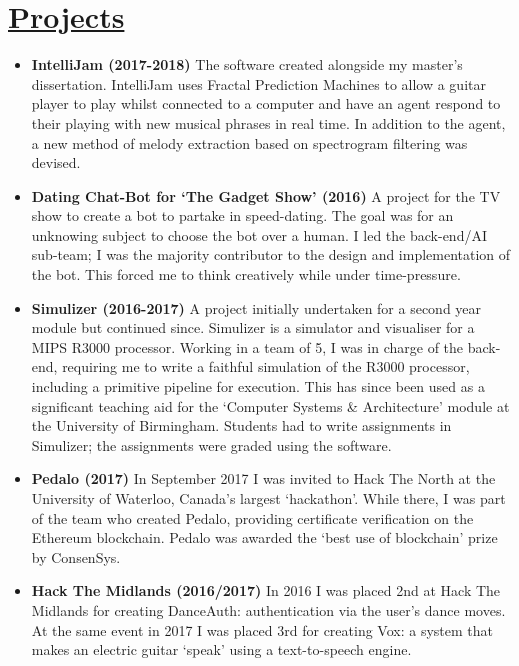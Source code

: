 \documentclass[11pt]{article}
\begin{document}
	\vspace{-20pt}
	\hspace{-100pt}\section*{\underline{Projects}} %
			\begin{itemize}
				\item \textbf{IntelliJam (2017-2018)} The software created alongside my master's dissertation. IntelliJam uses Fractal Prediction Machines to allow a guitar player to play whilst connected to a computer and have an agent respond to their playing with new musical phrases in real time. In addition to the agent, a new method of melody extraction based on spectrogram filtering was devised.
				\item \textbf{Dating Chat-Bot for `The Gadget Show' (2016)} A project for the TV show to create a bot to partake in speed-dating. The goal was for an unknowing subject to choose the bot over a human. I led the back-end/AI sub-team; I was the majority contributor to the design and implementation of the bot. This forced me to think creatively while under time-pressure.
				\item \textbf{Simulizer (2016-2017)} A project initially undertaken for a second year module but continued since. Simulizer is a simulator and visualiser for a MIPS R3000 processor. Working in a team of 5, I was in charge of the back-end, requiring me to write a faithful simulation of the R3000 processor, including a primitive pipeline for execution. This has since been used as a significant teaching aid for the `Computer Systems \& Architecture' module at the University of Birmingham. Students had to write assignments in Simulizer; the assignments were graded using the software.
				\item \textbf{Pedalo (2017)} In September 2017 I was invited to Hack The North at the University of Waterloo, Canada's largest `hackathon'. While there, I was part of the team who created Pedalo, providing certificate verification on the Ethereum blockchain. Pedalo was awarded the `best use of blockchain' prize by ConsenSys. 
				\item \textbf{Hack The Midlands (2016/2017)} In 2016 I was placed 2nd at Hack The Midlands for creating DanceAuth: authentication via the user's dance moves. At the same event in 2017 I was placed 3rd for creating Vox: a system that makes an electric guitar `speak' using a text-to-speech engine.
			\end{itemize}
\end{document}
